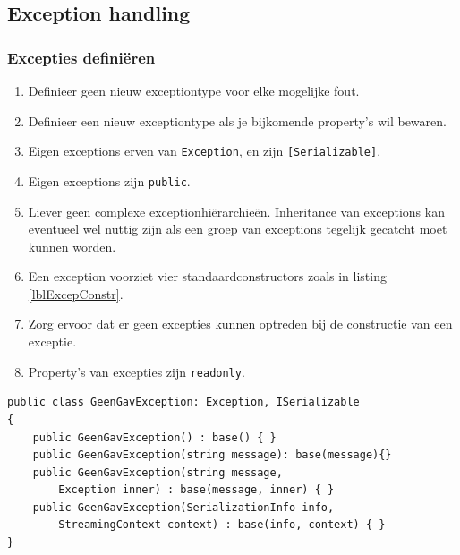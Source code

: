 \documentclass[a4paper,11pt]{article}
\begin{document}
\subsection{Exception handling}
\subsubsection{Excepties defini\"eren}
\begin{enumerate}[resume]
\item Definieer geen nieuw exceptiontype voor elke mogelijke fout.
\item Definieer een nieuw exceptiontype als je bijkomende property's wil
bewaren.
\item Eigen exceptions erven van \lstinline !Exception!, en zijn \lstinline ![Serializable]!.
\item Eigen exceptions zijn \lstinline !public!.
\item Liever geen complexe exceptionhi\"erarchie\"en.  Inheritance van
exceptions kan eventueel wel nuttig zijn als een groep van exceptions tegelijk gecatcht moet kunnen
worden.
\item Een exception voorziet vier standaardconstructors zoals in listing
\ref{lblExcepConstr}.
\item Zorg ervoor dat er geen excepties kunnen optreden bij de constructie
van een exceptie.
\item Property's van excepties zijn \lstinline !readonly!.
\end{enumerate}

\begin{lstlisting}[float,caption=Exceptions defini\"eren,label=lblExcepConstr]
public class GeenGavException: Exception, ISerializable
{
	public GeenGavException() : base() { }
	public GeenGavException(string message): base(message){}
	public GeenGavException(string message, 
		Exception inner) : base(message, inner) { }
	public GeenGavException(SerializationInfo info, 
		StreamingContext context) : base(info, context) { }
}
\end{lstlisting}
\end{document}
